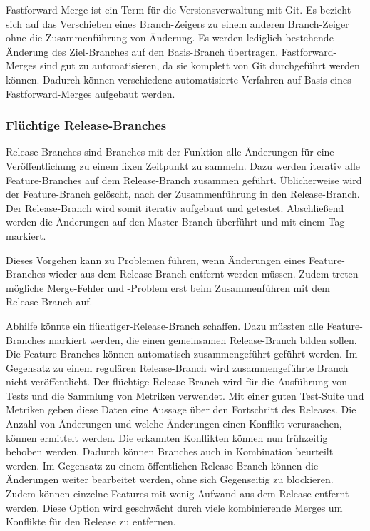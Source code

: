 Fastforward-Merge ist ein Term für die Versionsverwaltung mit Git. Es bezieht sich auf das Verschieben eines Branch-Zeigers zu einem anderen Branch-Zeiger ohne die Zusammenführung von Änderung. Es werden lediglich bestehende Änderung des Ziel-Branches auf den Basis-Branch übertragen.
Fastforward-Merges sind gut zu automatisieren, da sie komplett von Git durchgeführt werden können. Dadurch können verschiedene automatisierte Verfahren auf Basis eines Fastforward-Merges aufgebaut werden.

\subsubsection{Flüchtige Release-Branches}

Release-Branches sind Branches mit der Funktion alle Änderungen für eine Veröffentlichung zu einem fixen Zeitpunkt zu sammeln. Dazu werden iterativ alle Feature-Branches auf dem Release-Branch zusammen geführt. Üblicherweise wird der Feature-Branch gelöscht, nach der Zusammenführung in den Release-Branch. Der Release-Branch wird somit iterativ aufgebaut und getestet. Abschließend werden die Änderungen auf den Master-Branch überführt und mit einem Tag markiert.

Dieses Vorgehen kann zu Problemen führen, wenn Änderungen eines Feature-Branches wieder aus dem Release-Branch entfernt werden müssen. Zudem treten mögliche Merge-Fehler und -Problem erst beim Zusammenführen mit dem Release-Branch auf.

Abhilfe könnte ein \glqq flüchtiger\grqq{}-Release-Branch schaffen. Dazu müssten alle Feature-Branches markiert werden, die einen gemeinsamen Release-Branch bilden sollen. Die Feature-Branches können automatisch zusammengeführt geführt werden. Im Gegensatz zu einem regulären Release-Branch wird zusammengeführte Branch nicht veröffentlicht. Der flüchtige Release-Branch wird für die Ausführung von Tests und die Sammlung von Metriken verwendet. Mit einer guten Test-Suite und Metriken geben diese Daten eine Aussage über den Fortschritt des Releases. Die Anzahl von Änderungen und welche Änderungen einen Konflikt verursachen, können ermittelt werden. Die erkannten Konflikten können nun frühzeitig behoben werden. Dadurch können Branches auch in Kombination beurteilt werden. Im Gegensatz zu einem öffentlichen Release-Branch können die Änderungen weiter bearbeitet werden, ohne sich Gegenseitig zu blockieren. Zudem können einzelne Features mit wenig Aufwand aus dem Release entfernt werden. Diese Option wird geschwächt durch viele kombinierende Merges um Konflikte für den Release zu entfernen.

